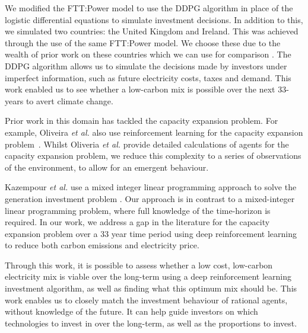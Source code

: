 \documentclass{article}
\begin{document}
We modified the FTT:Power model to use the DDPG algorithm in place of the logistic differential equations to simulate investment decisions. In addition to this, we simulated two countries: the United Kingdom and Ireland. This was achieved through the use of the same FTT:Power model. We choose these due to the wealth of prior work on these countries which we can use for comparison \cite{Hall2016, Hughes2010}. The DDPG algorithm allows us to simulate the decisions made by investors under imperfect information, such as future electricity costs, taxes and demand. This work enabled us to see whether a low-carbon mix is possible over the next 33-years to avert climate change. 


Prior work in this domain has tackled the capacity expansion problem. For example, Oliveira \textit{et al.} also use reinforcement learning for the capacity expansion problem~\cite{Oliveira2018}. Whilst Oliveria \textit{et al.} provide detailed calculations of agents for the capacity expansion problem, we reduce this complexity to a series of observations of the environment, to allow for an emergent behaviour. 

Kazempour \textit{et al.} use a mixed integer linear programming approach to solve the generation investment problem \cite{Kazempour2011}. Our approach is in contrast to a mixed-integer linear programming problem, where full knowledge of the time-horizon is required. In our work, we address a gap in the literature for the capacity expansion problem over a 33 year time period using deep reinforcement learning to reduce both carbon emissions and electricity price. 

Through this work, it is possible to assess whether a low cost, low-carbon electricity mix is viable over the long-term using a deep reinforcement learning investment algorithm, as well as finding what this optimum mix should be. This work enables us to closely match the investment behaviour of rational agents, without knowledge of the future. It can help guide investors on which technologies to invest in over the long-term, as well as the proportions to invest.
\end{document}
